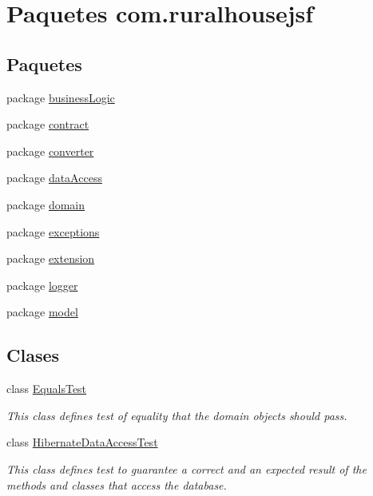 \hypertarget{namespacecom_1_1ruralhousejsf}{}\section{Paquetes com.\+ruralhousejsf}
\label{namespacecom_1_1ruralhousejsf}
\subsection*{Paquetes}
\begin{DoxyCompactItemize}
\item 
package \mbox{\hyperlink{namespacecom_1_1ruralhousejsf_1_1business_logic}{business\+Logic}}
\item 
package \mbox{\hyperlink{namespacecom_1_1ruralhousejsf_1_1contract}{contract}}
\item 
package \mbox{\hyperlink{namespacecom_1_1ruralhousejsf_1_1converter}{converter}}
\item 
package \mbox{\hyperlink{namespacecom_1_1ruralhousejsf_1_1data_access}{data\+Access}}
\item 
package \mbox{\hyperlink{namespacecom_1_1ruralhousejsf_1_1domain}{domain}}
\item 
package \mbox{\hyperlink{namespacecom_1_1ruralhousejsf_1_1exceptions}{exceptions}}
\item 
package \mbox{\hyperlink{namespacecom_1_1ruralhousejsf_1_1extension}{extension}}
\item 
package \mbox{\hyperlink{namespacecom_1_1ruralhousejsf_1_1logger}{logger}}
\item 
package \mbox{\hyperlink{namespacecom_1_1ruralhousejsf_1_1model}{model}}
\end{DoxyCompactItemize}
\subsection*{Clases}
\begin{DoxyCompactItemize}
\item 
class \mbox{\hyperlink{classcom_1_1ruralhousejsf_1_1_equals_test}{Equals\+Test}}
\begin{DoxyCompactList}\small\item\em This class defines test of equality that the domain objects should pass. \end{DoxyCompactList}\item 
class \mbox{\hyperlink{classcom_1_1ruralhousejsf_1_1_hibernate_data_access_test}{Hibernate\+Data\+Access\+Test}}
\begin{DoxyCompactList}\small\item\em This class defines test to guarantee a correct and an expected result of the methods and classes that access the database. \end{DoxyCompactList}\end{DoxyCompactItemize}
